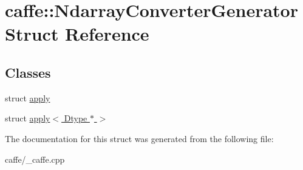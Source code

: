 \hypertarget{structcaffe_1_1_ndarray_converter_generator}{}\section{caffe\+:\+:Ndarray\+Converter\+Generator Struct Reference}
\label{structcaffe_1_1_ndarray_converter_generator}
\subsection*{Classes}
\begin{DoxyCompactItemize}
\item 
struct \hyperlink{structcaffe_1_1_ndarray_converter_generator_1_1apply}{apply}
\item 
struct \hyperlink{structcaffe_1_1_ndarray_converter_generator_1_1apply_3_01_dtype_01_5_01_4}{apply$<$ Dtype $\ast$ $>$}
\end{DoxyCompactItemize}


The documentation for this struct was generated from the following file\+:\begin{DoxyCompactItemize}
\item 
caffe/\+\_\+caffe.\+cpp\end{DoxyCompactItemize}
